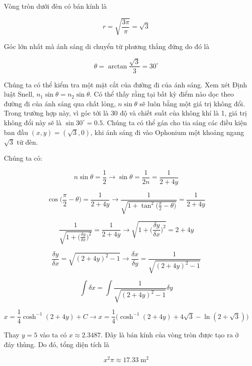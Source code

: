\begin{solution}
    Vòng tròn dưới đèn có bán kính là 

$$r = \sqrt{\frac{3\pi}{\pi}} = \sqrt{3}$$

Góc lớn nhất mà ánh sáng di chuyển từ phương thẳng đứng do đó là

$$\theta = \arctan{\frac{\sqrt{3}}{3}} = 30^{\circ}$$

Chúng ta có thể kiểm tra một mặt cắt của đường đi của ánh sáng. Xem xét Định luật Snell, $n_1\sin{\theta} = n_2\sin{\theta}$. Có thể thấy rằng tại bất kỳ điểm nào dọc theo đường đi của ánh sáng qua chất lỏng, $n\sin{\theta}$ sẽ luôn bằng một giá trị không đổi. Trong trường hợp này, vì góc tới là 30 độ và chiết suất của không khí là 1, giá trị không đổi này sẽ là $\sin{30^{\circ}} = 0.5$. Chúng ta có thể gán cho tia sáng các điều kiện ban đầu $(x,y) = (\sqrt{3},0)$, khi ánh sáng đi vào Ophonium một khoảng ngang $\sqrt{3}$ từ đèn.

Chúng ta có:

$$n\sin{\theta} = \frac{1}{2}\longrightarrow \sin{\theta} = \frac{1}{2n} = \frac{1}{2+4y}$$

$$\cos\bigg(\frac{\pi}{2}-\theta\bigg) = \frac{1}{2+4y}\longrightarrow\frac{1}{\sqrt{1+\tan^2\big(\frac{\pi}{2}-\theta\big)}} = \frac{1}{2+4y}$$

$$\frac{1}{\sqrt{1+\big(\frac{\delta y}{\delta x}\big)^2}} = \frac{1}{2+4y}\longrightarrow \sqrt{1+\big(\frac{\delta y}{\delta x}\big)^2} = 2 + 4y$$

$$\frac{\delta y}{\delta x} = \sqrt{(2+4y)^2 - 1}\longrightarrow \frac{\delta x}{\delta y} = \frac{1}{\sqrt{(2+4y)^2 - 1}}$$

$$\int \delta x = \int\frac{1}{\sqrt{(2+4y)^2 - 1}}\delta y$$

$$x = \frac{1}{4}\cosh^{-1}(2+4y)+ C \longrightarrow x = \frac{1}{4}\bigg(\cosh^{-1}(2+4y) + 4\sqrt{3} - \ln(2 + \sqrt{3})\bigg)$$

Thay $y = 5$ vào ta có $x \approx 2.3487$. Đây là bán kính của vòng tròn được tạo ra ở đáy thùng. Do đó, tổng diện tích là

$$x^2\pi \approx \boxed{17.33\;\mathrm{m^2}}$$
\end{solution}
